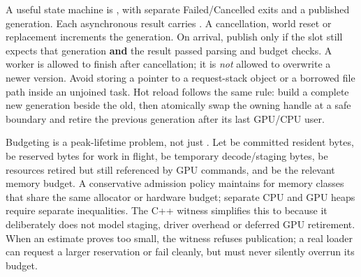 A useful state machine is , with separate Failed/Cancelled exits and a published generation. Each asynchronous result carries . A cancellation, world reset or replacement increments the generation. On arrival, publish only if the slot still expects that generation \textbf{and} the result passed parsing and budget checks. A worker is allowed to finish after cancellation; it is \emph{not} allowed to overwrite a newer version. Avoid storing a pointer to a request-stack object or a borrowed file path inside an unjoined task. Hot reload follows the same rule: build a complete new generation beside the old, then atomically swap the owning handle at a safe boundary and retire the previous generation after its last GPU/CPU user.

Budgeting is a peak-lifetime problem, not just . Let  be committed resident bytes,  be reserved bytes for work in flight,  be temporary decode/staging bytes,  be resources retired but still referenced by GPU commands, and  be the relevant memory budget. A conservative admission policy maintains  for memory classes that share the same allocator or hardware budget; separate CPU and GPU heaps require separate inequalities. The C++ witness simplifies this to  because it deliberately does not model staging, driver overhead or deferred GPU retirement. When an estimate proves too small, the witness refuses publication; a real loader can request a larger reservation or fail cleanly, but must never silently overrun its budget.

